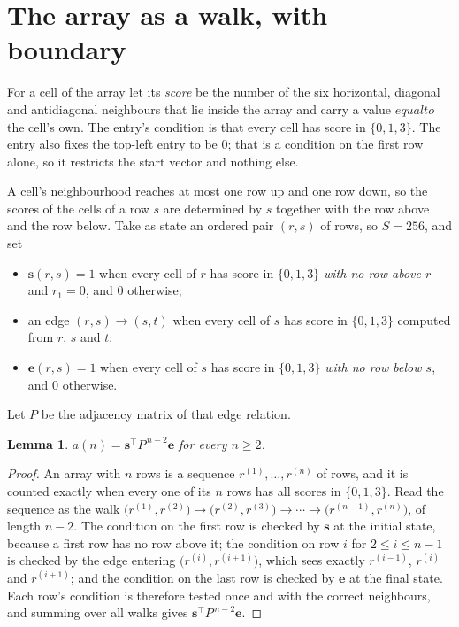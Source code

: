 \documentclass[11pt,a4paper]{article}
\theoremstyle{plain}
\newtheorem{lemma}[theorem]{Lemma}
\theoremstyle{definition}
\begin{document}
\section{The array as a walk, with boundary}

For a cell of the array let its \emph{score} be the number of the six horizontal, diagonal and antidiagonal neighbours that lie inside
the array and carry a value $equal to$ the cell's own. The entry's condition is that every cell
has score in $\{0,1,3\}$. The entry also fixes the top-left entry to be $0$; that is a condition on the first row alone, so it restricts the start vector and nothing else.

A cell's neighbourhood reaches at most one row up and one row down, so the scores of the
cells of a row $s$ are determined by $s$ together with the row above and the row below.
Take as state an ordered pair $(r,s)$ of rows, so $S=256$, and set
\begin{itemize}
\item $\mathbf{s}(r,s)=1$ when every cell of $r$ has score in $\{0,1,3\}$ \emph{with no row
above $r$} and $r_1=0$, and $0$ otherwise;
\item an edge $(r,s)\to(s,t)$ when every cell of $s$ has score in $\{0,1,3\}$ computed from
$r$, $s$ and $t$;
\item $\mathbf{e}(r,s)=1$ when every cell of $s$ has score in $\{0,1,3\}$ \emph{with no row
below $s$}, and $0$ otherwise.
\end{itemize}
Let $P$ be the adjacency matrix of that edge relation.

\begin{lemma}\label{lem:walk}
$a(n)=\mathbf{s}^{\!\top}P^{\,n-2}\mathbf{e}$ for every $n\ge2$.
\end{lemma}

\begin{proof}
An array with $n$ rows is a sequence $r^{(1)},\dots,r^{(n)}$ of rows, and it is counted
exactly when every one of its $n$ rows has all scores in $\{0,1,3\}$. Read the sequence as the
walk $\bigl(r^{(1)},r^{(2)}\bigr)\to\bigl(r^{(2)},r^{(3)}\bigr)\to\cdots\to
\bigl(r^{(n-1)},r^{(n)}\bigr)$, of length $n-2$. The condition on the first row is
checked by $\mathbf{s}$ at the initial state, because a first row has no row above it; the
condition on row $i$ for $2\le i\le n-1$ is checked by the edge entering
$\bigl(r^{(i)},r^{(i+1)}\bigr)$, which sees exactly $r^{(i-1)}$, $r^{(i)}$ and
$r^{(i+1)}$; and the condition on the last row is checked by $\mathbf{e}$ at the final
state. Each row's condition is therefore tested once and with the correct neighbours, and
summing over all walks gives $\mathbf{s}^{\!\top}P^{\,n-2}\mathbf{e}$.
\end{proof}
\end{document}
